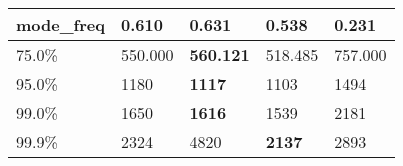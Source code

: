 \begin{table}[H]
\begin{tabular}{|l|m{10em}|m{10em}|m{10em}|m{10em}|}
\hline mode\_freq & 0.610 & \bfseries 0.631 & 0.538 & \cellcolor[rgb]{0.9, 0.54, 0.52} 0.231 \\
\hline 75.0\% & 550.000 & \bfseries 560.121 & 518.485 & \cellcolor[rgb]{0.9, 0.54, 0.52} 757.000 \\
\hline 95.0\% & 1180 & \bfseries 1117 & 1103 & \cellcolor[rgb]{0.9, 0.54, 0.52} 1494 \\
\hline 99.0\% & 1650 & \bfseries 1616 & 1539 & \cellcolor[rgb]{0.9, 0.54, 0.52} 2181 \\
\hline 99.9\% & 2324 & \cellcolor[rgb]{0.9, 0.54, 0.52} 4820 & \bfseries 2137 & 2893 \\
\hline
\end{tabular}
\end{table}

